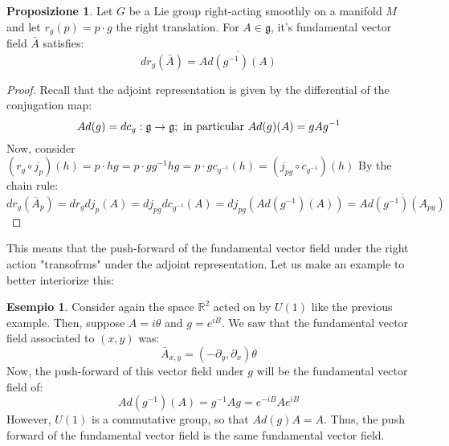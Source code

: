\documentclass[12pt,a4paper]{report}
\theoremstyle{definition}
\theoremstyle{Theorem}
\newtheorem{Prop}[Def]{Proposizione}
\theoremstyle{definition}
\newtheorem{Ex}[Def]{Esempio}
\theoremstyle{definition}
\theoremstyle{definition}
\begin{document}
		\begin{Prop}
			Let $G$ be a Lie group right-acting smoothly on a manifold $M$ and let $r_g(p)=p\cdot g$ the right translation. For $A\in\mathfrak{g}$, it's fundamental vector field $\bar{A}$ satisfies:
			$$dr_g(\bar{A})=\overline{Ad(g^{-1})(A)}$$
		\end{Prop}
		\begin{proof}
			Recall that the adjoint representation is given by the differential of the conjugation map:
			$$Ad(g)=dc_g:\mathfrak{g}\rightarrow\mathfrak{g};\hbox{ in particular }Ad(g)(A)=gAg^{-1}$$
			Now, consider $(r_g\circ j_p)(h)=p\cdot hg=p\cdot gg^{-1}hg=p\cdot g c_{g^{-1}}(h)=(j_{pg}\circ c_{g^{-1}})(h)$
			By the chain rule:
			$$dr_g(\bar{A}_p)=dr_gdj_p(A)=dj_{pg}dc_{g^{-1}}(A)=dj_{pg}(Ad(g^{-1})(A))=\overline{Ad(g^{-1})(A_{pg})}$$
		\end{proof}
		This means that the push-forward of the fundamental vector field under the right action "transofrms" under the adjoint representation. Let us make an example to better interiorize this:
		\begin{Ex}
			Consider again the space $\mathbb{R}^2$ acted on by $U(1)$ like the previous example. Then, suppose $A=i\theta$ and $g=e^{iB}$. We saw that the fundamental vector field associated to $(x,y)$ was:
			$$\bar{A}_{x,y}=(-\partial_y,\partial_x)\theta$$
			Now, the push-forward of this vector field under $g$ will be the fundamental vector field of:
			$$Ad(g^{-1})(A)=g^{-1}Ag=e^{-iB}Ae^{iB}$$
			However, $U(1)$ is a commutative group, so that $Ad(g)A=A$. Thus, the push forward of the fundamental vector field is the same fundamental vector field.
		\end{Ex}
\end{document}
